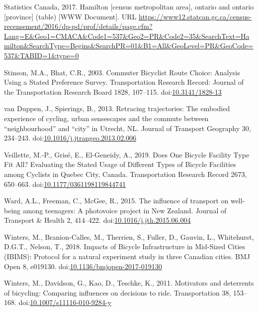 \documentclass[]{elsarticle} %
\begin{document}
\leavevmode\hypertarget{ref-Statistics2016}{}%
Statistics Canada, 2017. Hamilton {[}census metropolitan area{]},
ontario and ontario {[}province{]} (table) {[}WWW Document{]}. URL
\url{https://www12.statcan.gc.ca/census-recensement/2016/dp-pd/prof/details/page.cfm?Lang=E\&Geo1=CMACA\&Code1=537\&Geo2=PR\&Code2=35\&SearchText=Hamilton\&SearchType=Begins\&SearchPR=01\&B1=All\&GeoLevel=PR\&GeoCode=537\&TABID=1\&type=0}

\leavevmode\hypertarget{ref-stinsonCommuterBicyclistRoute2003}{}%
Stinson, M.A., Bhat, C.R., 2003. Commuter Bicyclist Route Choice:
Analysis Using a Stated Preference Survey. Transportation Research
Record: Journal of the Transportation Research Board 1828, 107--115.
doi:\href{https://doi.org/10.3141/1828-13}{10.3141/1828-13}

\leavevmode\hypertarget{ref-vanduppenRetracingTrajectoriesEmbodied2013}{}%
van Duppen, J., Spierings, B., 2013. Retracing trajectories: The
embodied experience of cycling, urban sensescapes and the commute
between ``neighbourhood'' and ``city'' in Utrecht, NL. Journal of
Transport Geography 30, 234--243.
doi:\href{https://doi.org/10.1016/j.jtrangeo.2013.02.006}{10.1016/j.jtrangeo.2013.02.006}

\leavevmode\hypertarget{ref-veilletteDoesOneBicycle2019}{}%
Veillette, M.-P., Grisé, E., El-Geneidy, A., 2019. Does One Bicycle
Facility Type Fit All? Evaluating the Stated Usage of Different Types of
Bicycle Facilities among Cyclists in Quebec City, Canada. Transportation
Research Record 2673, 650--663.
doi:\href{https://doi.org/10.1177/0361198119844741}{10.1177/0361198119844741}

\leavevmode\hypertarget{ref-wardInfluenceTransportWellbeing2015}{}%
Ward, A.L., Freeman, C., McGee, R., 2015. The influence of transport on
well-being among teenagers: A photovoice project in New Zealand. Journal
of Transport \& Health 2, 414--422.
doi:\href{https://doi.org/10.1016/j.jth.2015.06.004}{10.1016/j.jth.2015.06.004}

\leavevmode\hypertarget{ref-wintersImpactsBicycleInfrastructure2018}{}%
Winters, M., Branion-Calles, M., Therrien, S., Fuller, D., Gauvin, L.,
Whitehurst, D.G.T., Nelson, T., 2018. Impacts of Bicycle Infrastructure
in Mid-Sized Cities (IBIMS): Protocol for a natural experiment study in
three Canadian cities. BMJ Open 8, e019130.
doi:\href{https://doi.org/10.1136/bmjopen-2017-019130}{10.1136/bmjopen-2017-019130}

\leavevmode\hypertarget{ref-wintersMotivatorsDeterrentsBicycling2011}{}%
Winters, M., Davidson, G., Kao, D., Teschke, K., 2011. Motivators and
deterrents of bicycling: Comparing influences on decisions to ride.
Transportation 38, 153--168.
doi:\href{https://doi.org/10.1007/s11116-010-9284-y}{10.1007/s11116-010-9284-y}
\end{document}
